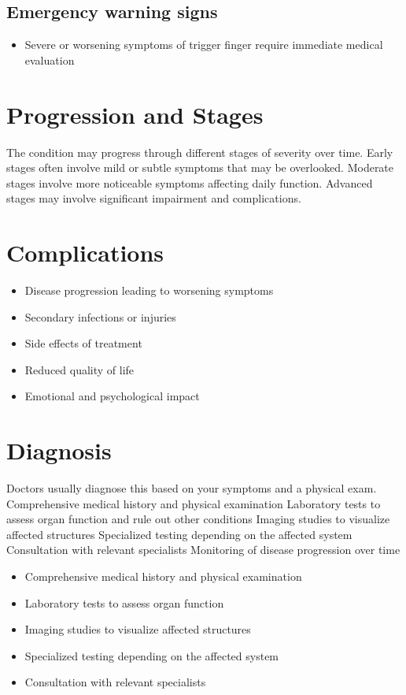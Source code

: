 \subsection{Emergency warning signs}
\begin{itemize}[noitemsep]
  \item Severe or worsening symptoms of trigger finger require immediate medical evaluation
\end{itemize}
\section{Progression and Stages}
The condition may progress through different stages of severity over time. Early stages often involve mild or subtle symptoms that may be overlooked. Moderate stages involve more noticeable symptoms affecting daily function. Advanced stages may involve significant impairment and complications.
\section{Complications}
\begin{itemize}[noitemsep]
  \item Disease progression leading to worsening symptoms
  \item Secondary infections or injuries
  \item Side effects of treatment
  \item Reduced quality of life
  \item Emotional and psychological impact
\end{itemize}
\section{Diagnosis}
Doctors usually diagnose this based on your symptoms and a physical exam. Comprehensive medical history and physical examination Laboratory tests to assess organ function and rule out other conditions Imaging studies to visualize affected structures Specialized testing depending on the affected system Consultation with relevant specialists Monitoring of disease progression over time

\begin{itemize}[noitemsep]
  \item Comprehensive medical history and physical examination
  \item Laboratory tests to assess organ function
  \item Imaging studies to visualize affected structures
  \item Specialized testing depending on the affected system
  \item Consultation with relevant specialists
\end{itemize}
